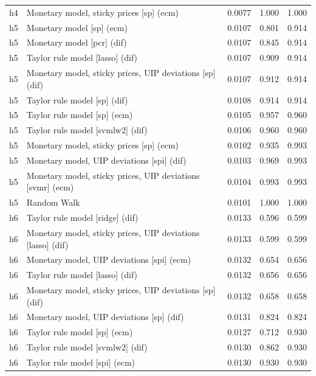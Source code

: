 \begin{ThreePartTable}
\begin{longtable}[t]{cp{5.5cm}ccc}
h4 & \raggedright Monetary model, sticky prices [sp] (ecm) & 0.0077 & 1.000 & 1.000\\
\addlinespace
h5 & \raggedright Monetary model [sp] (ecm) & 0.0107 & 0.801 & 0.914\\
h5 & \raggedright Monetary model [pcr] (dif) & 0.0107 & 0.845 & 0.914\\
h5 & \raggedright Taylor rule model [lasso] (dif) & 0.0107 & 0.909 & 0.914\\
h5 & \raggedright Monetary model, sticky prices, UIP deviations [sp] (dif) & 0.0107 & 0.912 & 0.914\\
h5 & \raggedright Taylor rule model [sp] (dif) & 0.0108 & 0.914 & 0.914\\
h5 & \raggedright Taylor rule model [sp] (ecm) & 0.0105 & 0.957 & 0.960\\
h5 & \raggedright Taylor rule model [svmlw2] (dif) & 0.0106 & 0.960 & 0.960\\
h5 & \raggedright Monetary model, sticky prices [sp] (ecm) & 0.0102 & 0.935 & 0.993\\
h5 & \raggedright Monetary model, UIP deviations [spi] (dif) & 0.0103 & 0.969 & 0.993\\
h5 & \raggedright Monetary model, sticky prices, UIP deviations [svmr] (ecm) & 0.0104 & 0.993 & 0.993\\
h5 & \raggedright Random Walk & 0.0101 & 1.000 & 1.000\\
\addlinespace
h6 & \raggedright Taylor rule model [ridge] (dif) & 0.0133 & 0.596 & 0.599\\
h6 & \raggedright Monetary model, sticky prices, UIP deviations [lasso] (dif) & 0.0133 & 0.599 & 0.599\\
h6 & \raggedright Monetary model, UIP deviations [spi] (ecm) & 0.0132 & 0.654 & 0.656\\
h6 & \raggedright Taylor rule model [lasso] (dif) & 0.0132 & 0.656 & 0.656\\
h6 & \raggedright Monetary model, sticky prices, UIP deviations [sp] (dif) & 0.0132 & 0.658 & 0.658\\
h6 & \raggedright Monetary model, UIP deviations [sp] (dif) & 0.0131 & 0.824 & 0.824\\
h6 & \raggedright Taylor rule model [sp] (ecm) & 0.0127 & 0.712 & 0.930\\
h6 & \raggedright Taylor rule model [svmlw2] (dif) & 0.0130 & 0.862 & 0.930\\
h6 & \raggedright Taylor rule model [spi] (ecm) & 0.0130 & 0.930 & 0.930\\

\end{longtable}
\end{ThreePartTable}
